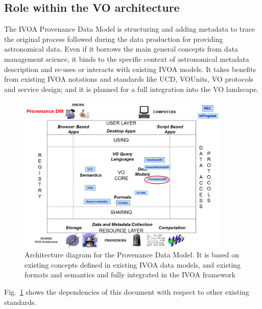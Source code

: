 \subsection{Role within the VO architecture}

The IVOA Provenance Data Model is structuring and adding metadata to trace the
original process followed during the data production for providing astronomical
data. Even if it borrows the main general concepts from data
management science, it binds to the specific context of astronomical metadata
description and re-uses or interacts with existing IVOA models. It takes
benefits from existing IVOA notations and standards like UCD, VOUnits, VO
protocols and service design; and it is planned for a full integration into the
VO landscape.

\begin{figure}
\centering
\includegraphics[width=0.9\textwidth]{VOArchitecture-Prov2016.png}
\caption[Architecture diagram for the Provenance Data Model]{Architecture diagram for the Provenance Data Model. It is based on existing concepts defined in existing IVOA data models, and existing formats and semantics and fully integrated in the IVOA framework}
\label{fig:archdiag}
\end{figure}

Fig.~\ref{fig:archdiag} shows the dependencies of this document with respect to other existing standards.
